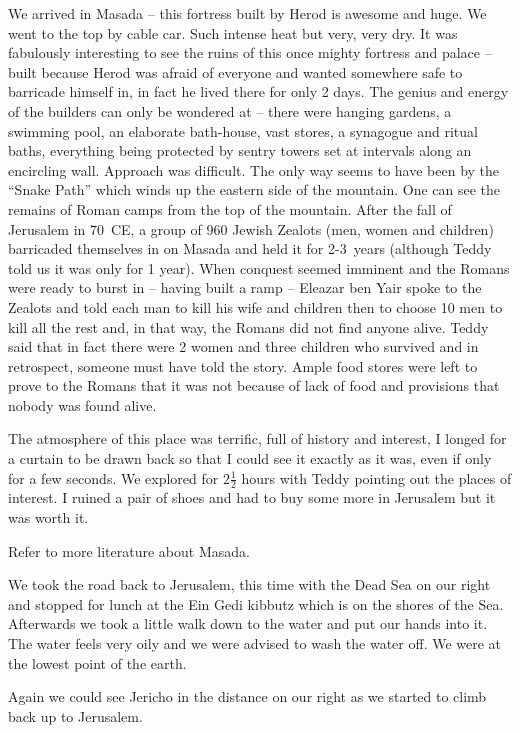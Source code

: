 We arrived in Masada -- this fortress built by Herod is awesome and
huge. We went to the top by cable car. Such intense heat but very,
very dry. It was fabulously interesting to see the ruins of this once
mighty fortress and palace -- built because Herod was afraid of
everyone and wanted somewhere safe to barricade himself in, in fact he
lived there for only 2 days. The genius and energy of the builders can
only be wondered at -- there were hanging gardens, a swimming pool, an
elaborate bath-house, vast stores, a synagogue and ritual baths,
everything being protected by sentry towers set at intervals along an
encircling wall. Approach was difficult. The only way seems to have
been by the ``Snake Path'' which winds up the eastern side of the
mountain. One can see the remains of Roman camps from the top of the
mountain. After the fall of Jerusalem in 70~CE, a group of 960 Jewish
Zealots (men, women and children) barricaded themselves in on Masada
and held it for 2-3~years (although Teddy told us it was only for 1
year). When conquest seemed imminent and the Romans were ready to
burst in -- having built a ramp -- Eleazar ben Yair spoke to the
Zealots and told each man to kill his wife and children then to choose
10 men to kill all the rest and, in that way, the Romans did not find
anyone alive. Teddy said that in fact there were 2 women and three
children who survived and in retrospect, someone must have told the
story. Ample food stores were left to prove to the Romans that it was
not because of lack of food and provisions that nobody was found
alive.

The atmosphere of this place was terrific, full of history and
interest, I longed for a curtain to be drawn back so that I could see
it exactly as it was, even if only for a few seconds. We explored for
$2 \frac{1}{2}$ hours with Teddy pointing out the places of
interest. I ruined a pair of shoes and had to buy some more in
Jerusalem but it was worth it.

Refer to more literature about Masada.

We took the road back to Jerusalem, this time with the Dead Sea on our
right and stopped for lunch at the Ein Gedi kibbutz which is on the
shores of the Sea. Afterwards we took a little walk down to the water
and put our hands into it. The water feels very oily and we were
advised to wash the water off. We were at the lowest point of the
earth.

Again we could see Jericho in the distance on our right as we started
to climb back up to Jerusalem.

